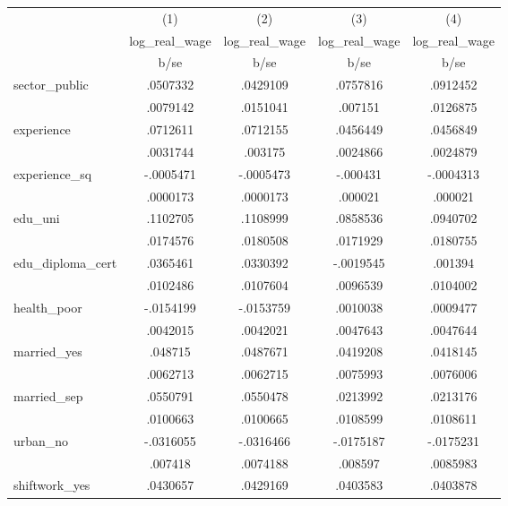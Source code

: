 {
\def\sym#1{\ifmmode^{#1}\else\(^{#1}\)\fi}
\begin{tabular}{l*{4}{c}}
\hline\hline
            &\multicolumn{1}{c}{(1)}&\multicolumn{1}{c}{(2)}&\multicolumn{1}{c}{(3)}&\multicolumn{1}{c}{(4)}\\
            &\multicolumn{1}{c}{log\_real\_wage}&\multicolumn{1}{c}{log\_real\_wage}&\multicolumn{1}{c}{log\_real\_wage}&\multicolumn{1}{c}{log\_real\_wage}\\
            &        b/se&        b/se&        b/se&        b/se\\
\hline
sector\_public&    .0507332&    .0429109&    .0757816&    .0912452\\
            &    .0079142&    .0151041&     .007151&    .0126875\\
experience  &    .0712611&    .0712155&    .0456449&    .0456849\\
            &    .0031744&     .003175&    .0024866&    .0024879\\
experience\_sq&   -.0005471&   -.0005473&    -.000431&   -.0004313\\
            &    .0000173&    .0000173&     .000021&     .000021\\
edu\_uni     &    .1102705&    .1108999&    .0858536&    .0940702\\
            &    .0174576&    .0180508&    .0171929&    .0180755\\
edu\_diploma\_cert&    .0365461&    .0330392&   -.0019545&     .001394\\
            &    .0102486&    .0107604&    .0096539&    .0104002\\
health\_poor &   -.0154199&   -.0153759&    .0010038&    .0009477\\
            &    .0042015&    .0042021&    .0047643&    .0047644\\
married\_yes &     .048715&    .0487671&    .0419208&    .0418145\\
            &    .0062713&    .0062715&    .0075993&    .0076006\\
married\_sep &    .0550791&    .0550478&    .0213992&    .0213176\\
            &    .0100663&    .0100665&    .0108599&    .0108611\\
urban\_no    &   -.0316055&   -.0316466&   -.0175187&   -.0175231\\
            &     .007418&    .0074188&     .008597&    .0085983\\
shiftwork\_yes&    .0430657&    .0429169&    .0403583&    .0403878\\

\end{tabular}}
